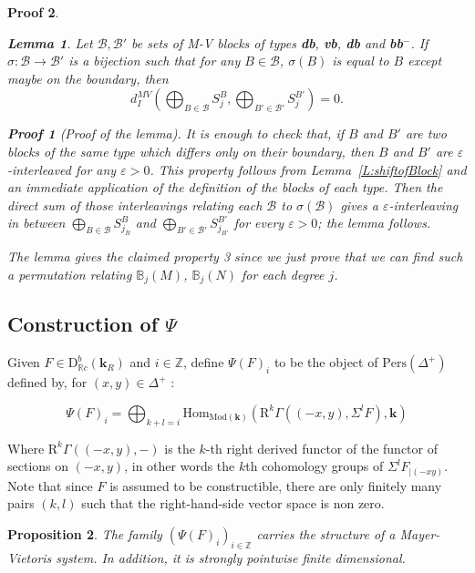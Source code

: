 \documentclass[a4paper, english, 11pt]{article}
\newcommand{\kk}[0]{\textbf{k}}
\newcommand{\Mod}[0]{\text{Mod}}
\newcommand{\0}{\vec{0}}
\newcommand{\R}[0]{\mathbb{R}}
\newcommand{\Z}[0]{\mathbb{Z}}
\newcommand{\D}[0]{\text{D}}
\newcommand{\Hom}[0]{\text{Hom}}
\newcommand{\Pers}[0]{\text{Pers}}
\newcommand{\Rr}[0]{\text{R}}
\newtheorem{prop}{Proposition}[section]
\newtheorem*{pf}{Proof} }
\newtheorem{lem}[prop]{Lemma}
\begin{document}
\begin{pf}
\begin{lem} Let $\mathcal{B}, \mathcal{B}'$ be sets of M-V blocks of types \textbf{db}, \textbf{vb}, \textbf{db} and \textbf{bb}$^-$. 
If $\sigma: \mathcal{B} \to \mathcal{B}'$ is a bijection such that for any $B\in \mathcal{B}$, $\sigma(B)$ is equal to $B$ except maybe on the boundary, then 
$$d_I^{MV}\left(\bigoplus_{B\in \mathcal{B}} S^B_{j}, \bigoplus_{B'\in \mathcal{B}'} S^{B'}_{j}\right) =0.$$
\end{lem}
\begin{pf}[Proof of the lemma] It is enough to check that,
 if $B$ and $B'$ are two blocks of the same type which differs only on their boundary, then $B$ and $B'$ are $\varepsilon$-interleaved for any $\varepsilon >0$. This property follows from Lemma~\ref{L:shiftofBlock} and an immediate application of the definition of the blocks of each type. 
 Then  the direct sum of those interleavings relating each $\mathcal{B}$ to $\sigma(\mathcal{B})$  gives a $\varepsilon$-interleaving in between $\bigoplus_{B\in \mathcal{B}} S^B_{j_B}$ and  $\bigoplus_{B'\in \mathcal{B}'} S^{B'}_{j_{B'}}$ for every $\varepsilon >0$; the lemma follows.
\end{pf}
The lemma gives the claimed property 3 since we just prove that we can find such a 
permutation relating $\mathbb{B}_j(M)$, $\mathbb{B}_j(N)$ for each degree $j$.
\end{pf}



\subsection{Construction of $\Psi$}

Given $F \in \D^b_{\R c}(\kk_R)$ and $i \in \Z$, define $\Psi(F)_i$ to be the object of $\Pers(\Delta^+)$ defined by, for $(x,y)\in \Delta^+$ : 

$$\Psi(F)_i =\bigoplus_{k+l = i} \Hom_{\Mod(\kk)}\left ( \Rr^k\Gamma \left ( (-x,y) , \Sigma^l F\right ), \kk \right )  $$

Where $\Rr^k\Gamma \left ( (-x,y) , -\right )$ is the $k$-th right derived functor of the functor of sections on $(-x,y)$, in other words the $k$th cohomology groups of $\Sigma^l F_{|(-xy)}$. Note that since $F$ is assumed to be constructible, there are only finitely many pairs $(k,l)$ such that the right-hand-side vector space is non zero.

\begin{prop}\label{P:psiofCOnstrisMV}
The family $(\Psi(F)_i)_{i\in \Z}$ carries the structure of a Mayer-Vietoris system. In addition, it is strongly pointwise finite dimensional. 
\end{prop}
\end{document}
